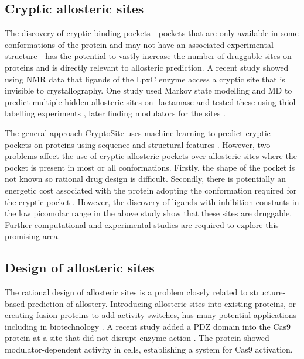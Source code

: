 \subsection{Cryptic allosteric sites}

The discovery of cryptic binding pockets - pockets that are only available in some conformations of the protein and may not have an associated experimental structure - has the potential to vastly increase the number of druggable sites on proteins \cite{Boehr2009} and is directly relevant to allosteric prediction.
A recent study \cite{Lee2016} showed using NMR data that ligands of the LpxC enzyme access a cryptic site that is invisible to crystallography.
One study used Markov state modelling and MD to predict multiple hidden allosteric sites on \textbeta -lactamase and tested these using thiol labelling experiments \cite{Bowman2015}, later finding modulators for the sites \cite{Hart2017}.

The general approach CryptoSite uses machine learning to predict cryptic pockets on proteins using sequence and structural features \cite{Cimermancic2016}.
However, two problems affect the use of cryptic allosteric pockets over allosteric sites where the pocket is present in most or all conformations.
Firstly, the shape of the pocket is not known so rational drug design is difficult.
Secondly, there is potentially an energetic cost associated with the protein adopting the conformation required for the cryptic pocket \cite{Oleinikovas2016}.
However, the discovery of ligands with inhibition constants in the low picomolar range in the above study \cite{Lee2016} show that these sites are druggable.
Further computational and experimental studies are required to explore this promising area.


\subsection{Design of allosteric sites}

The rational design of allosteric sites is a problem closely related to structure-based prediction of allostery.
Introducing allosteric sites into existing proteins, or creating fusion proteins to add activity switches, has many potential applications including in biotechnology \cite{Makhlynets2015}.
A recent study added a PDZ domain into the Cas9 protein at a site that did not disrupt enzyme action \cite{Oakes2016}.
The protein showed modulator-dependent activity in cells, establishing a system for Cas9 activation.

